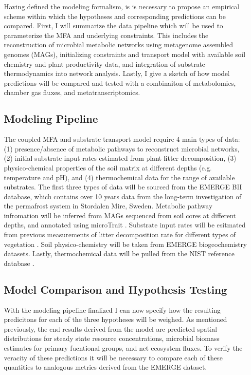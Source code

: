 

Having defined the modeling formalism, is is necessary to propose an empirical scheme within which the hypotheses and corresponding predictions can be compared. First, I will summarize the data pipeline which will be used to parameterize the MFA and underlying constraints. This includes the reconstruction of microbial metabolic networks using metagenome assembled genomes (MAGs), initializing constraints and transport model with available soil chemistry and plant productivity data, and integration of substrate thermodynamics into network analysis. Lastly, I give a sketch of how model predictions will be compared and tested with a combinaiton of metabolomics, chamber gas fluxes, and metatranscriptomics.

\subsection{Modeling Pipeline}

The coupled MFA and substrate transport model require 4 main types of data: (1) presence/absence of metabolic pathways to reconstruct microbial networks, (2) initial substrate input rates estimated from plant litter decomposition, (3) physico-chemical properties of the soil matrix at different depths (e.g. temperature and pH), and (4) thermochemical data for the range of available substrates. The first three types of data will be sourced from the EMERGE BII database, which contains over 10 years data from the long-term investigation of the permafrost system in Stordalen Mire, Sweden. Metabolic pathway infromation will be inferred from MAGs sequenced from soil cores at different depths, and annotated using microTrait \cite{karaoz2022a}. Substrate input rates will be esitmated from previous measurements of litter decomposition rate for different types of vegetation \cite{hough2022a}. Soil physico-chemistry will be taken from EMERGE biogeochemistry datasets. Lastly, thermochemical data will be pulled from the NIST reference database \cite{p_nist_1998}.

\subsection{Model Comparison and Hypothesis Testing}

With the modeling pipeline finalized I can now specify how the resulting predicitons for each of the three hypotheses will be weighed. As mentioned previously, the end results derived from the model are predicted spatial distributions for steady state resource concentrations, microbial biomass estimates for primary fucntional groups, and net ecosystem fluxes. To verify the veracity of these predictions it will be necessary to compare each of these quantities to analogous metrics derived from the EMERGE dataset.






